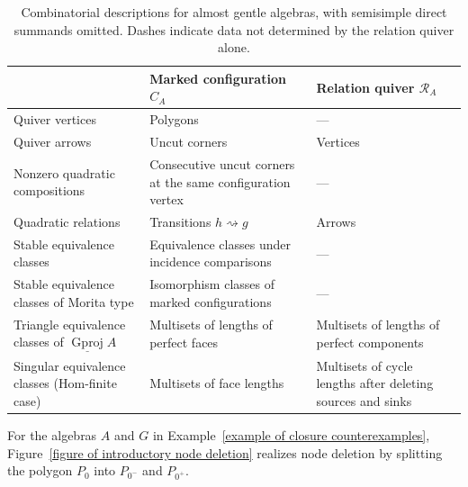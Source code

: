 \documentclass[11pt]{article}
\theoremstyle{definition}
\begin{document}
	\begin{table}[htbp]
		\centering
		\small
		\setlength{\tabcolsep}{4pt}
		\renewcommand{\arraystretch}{1.16}
		\begin{tabular}{@{}
				>{\raggedright\arraybackslash}p{}
				>{\raggedright\arraybackslash}p{}
				>{\raggedright\arraybackslash}p{}@{}}
			\toprule
			& Marked configuration $C_A$ & Relation quiver $\mathcal R_A$ \\
			\midrule
			Quiver vertices
			& Polygons & --- \\
			Quiver arrows
			& Uncut corners & Vertices \\
			Nonzero quadratic compositions
			& Consecutive uncut corners at the same configuration vertex
			& --- \\
			Quadratic relations
			& Transitions $h\rightsquigarrow g$ & Arrows \\
			\midrule
			Stable equivalence classes
			& Equivalence classes under incidence comparisons
			& --- \\
			Stable equivalence classes of Morita type
			& Isomorphism classes of marked configurations
			& --- \\
			Triangle equivalence classes of $\underline{\operatorname{Gproj}}A$
			& Multisets of lengths of perfect faces
			& Multisets of lengths of perfect components \\
			Singular equivalence classes (Hom-finite case)
			& Multisets of face lengths
			& Multisets of cycle lengths after deleting sources and sinks \\
			\bottomrule
		\end{tabular}
		\caption{Combinatorial descriptions for almost gentle algebras,
			with semisimple direct summands omitted.
			Dashes indicate data not determined by the relation quiver alone.}
		\label{table of configuration relation comparison}
	\end{table}



	For the algebras $A$ and $G$ in Example~\ref{example of closure counterexamples}, Figure~\ref{figure of introductory node deletion} realizes node deletion by splitting the polygon $P_0$ into $P_{0^-}$ and $P_{0^+}$.
\end{document}

